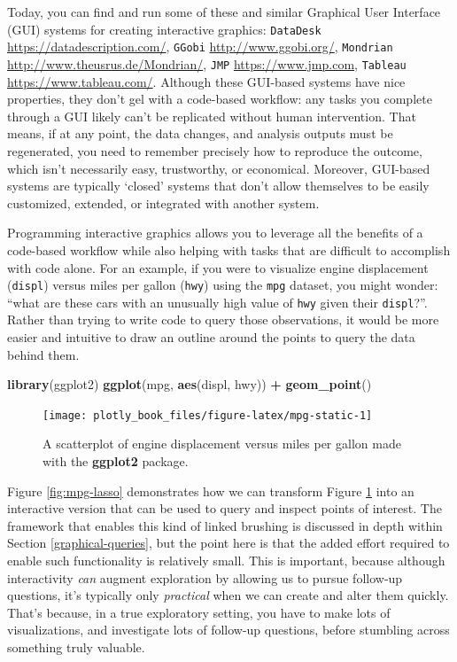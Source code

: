 \documentclass[
  12pt,
]{krantz}
\newenvironment{Shaded}{\begin{snugshade}}{\end{snugshade}}
\newcommand{\KeywordTok}[1]{\textcolor[rgb]{0.13,0.29,0.53}{\textbf{#1}}}
\newcommand{\NormalTok}[1]{#1}
\newcommand{\OperatorTok}[1]{\textcolor[rgb]{0.81,0.36,0.00}{\textbf{#1}}}
\newcommand{\StringTok}[1]{\textcolor[rgb]{0.31,0.60,0.02}{#1}}
\begin{document}
Today, you can find and run some of these and similar Graphical User Interface (GUI) systems for creating interactive graphics: \texttt{DataDesk} \url{https://datadescription.com/}, \texttt{GGobi} \url{http://www.ggobi.org/}, \texttt{Mondrian} \url{http://www.theusrus.de/Mondrian/}, \texttt{JMP} \url{https://www.jmp.com}, \texttt{Tableau} \url{https://www.tableau.com/}. Although these GUI-based systems have nice properties, they don't gel with a code-based workflow: any tasks you complete through a GUI likely can't be replicated without human intervention. That means, if at any point, the data changes, and analysis outputs must be regenerated, you need to remember precisely how to reproduce the outcome, which isn't necessarily easy, trustworthy, or economical. Moreover, GUI-based systems are typically `closed' systems that don't allow themselves to be easily customized, extended, or integrated with another system.

Programming interactive graphics allows you to leverage all the benefits of a code-based workflow while also helping with tasks that are difficult to accomplish with code alone. For an example, if you were to visualize engine displacement (\texttt{displ}) versus miles per gallon (\texttt{hwy}) using the \texttt{mpg} dataset, you might wonder: ``what are these cars with an unusually high value of \texttt{hwy} given their \texttt{displ}?''. Rather than trying to write code to query those observations, it would be more easier and intuitive to draw an outline around the points to query the data behind them.

\begin{Shaded}
\begin{Highlighting}[]
\KeywordTok{library}\NormalTok{(ggplot2)}
\KeywordTok{ggplot}\NormalTok{(mpg, }\KeywordTok{aes}\NormalTok{(displ, hwy)) }\OperatorTok{+}\StringTok{ }\KeywordTok{geom_point}\NormalTok{()}
\end{Highlighting}
\end{Shaded}

\begin{figure}

{\centering \texttt{[image: plotly\_book\_files/figure-latex/mpg-static-1]} 

}

\caption{A scatterplot of engine displacement versus miles per gallon made with the \textbf{ggplot2} package.}\label{fig:mpg-static}
\end{figure}

Figure \ref{fig:mpg-lasso} demonstrates how we can transform Figure \ref{fig:mpg-static} into an interactive version that can be used to query and inspect points of interest. The framework that enables this kind of linked brushing is discussed in depth within Section \ref{graphical-queries}, but the point here is that the added effort required to enable such functionality is relatively small. This is important, because although interactivity \emph{can} augment exploration by allowing us to pursue follow-up questions, it's typically only \emph{practical} when we can create and alter them quickly. That's because, in a true exploratory setting, you have to make lots of visualizations, and investigate lots of follow-up questions, before stumbling across something truly valuable.
\end{document}
